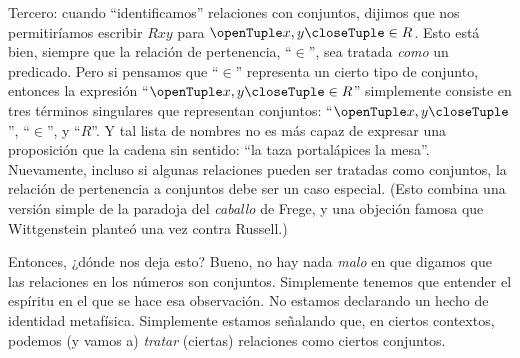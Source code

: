 \documentclass[../../../include/open-logic-section]{subfiles}
\begin{document}
Tercero: cuando ``identificamos'' relaciones con conjuntos, dijimos que nos permitiríamos escribir $Rxy$ para $\tuple{x,y} \in R$. Esto está bien, siempre que la relación de pertenencia, ``$\in$'', sea tratada \emph{como} un predicado. Pero si pensamos que ``$\in$'' representa un cierto tipo de conjunto, entonces la expresión ``$\tuple{x,y} \in R$'' simplemente consiste en tres términos singulares que representan conjuntos: ``$\tuple{x,y}$'', ``$\in$'', y ``$R$''. Y tal lista de nombres no es más capaz de expresar una proposición que la cadena sin sentido: ``la taza portalápices la mesa''. Nuevamente, incluso si algunas relaciones pueden ser tratadas como conjuntos, la relación de pertenencia a conjuntos debe ser un caso especial. (Esto combina una versión simple de la paradoja del \emph{caballo} de Frege, y una objeción famosa que Wittgenstein planteó una vez contra Russell.)

Entonces, ¿dónde nos deja esto? Bueno, no hay nada \emph{malo} en que digamos que las relaciones en los números son conjuntos. Simplemente tenemos que entender el espíritu en el que se hace esa observación. No estamos declarando un hecho de identidad metafísica. Simplemente estamos señalando que, en ciertos contextos, podemos (y vamos a) \emph{tratar} (ciertas) relaciones como ciertos conjuntos.
\end{document}
